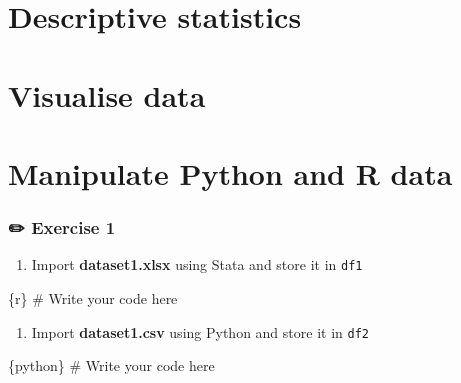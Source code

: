 \documentclass[
  letterpaper,
  DIV=11,
  numbers=noendperiod]{scrreprt}
\newenvironment{Shaded}{\begin{snugshade}}{\end{snugshade}}
\newcommand{\CommentTok}[1]{\textcolor[rgb]{0.37,0.37,0.37}{#1}}
\newcommand{\InformationTok}[1]{\textcolor[rgb]{0.37,0.37,0.37}{#1}}
\providecommand{\tightlist}{%
  \setlength{\itemsep}{0pt}\setlength{\parskip}{0pt}}\usepackage{longtable,booktabs,array}
\begin{document}
\hypertarget{descriptive-statistics}{%
\section{Descriptive statistics}\label{descriptive-statistics}}

\hypertarget{visualise-data}{%
\section{Visualise data}\label{visualise-data}}

\hypertarget{manipulate-python-and-r-data}{%
\section{Manipulate Python and R
data}\label{manipulate-python-and-r-data}}

\hypertarget{exercise-1-1}{%
\subsubsection{\texorpdfstring{{✏️} Exercise
1}{✏️ Exercise 1}}\label{exercise-1-1}}

\begin{enumerate}
\def\labelenumi{\arabic{enumi}.}
\tightlist
\item
  Import \textbf{dataset1.xlsx} using Stata and store it in \texttt{df1}
\end{enumerate}

\begin{Shaded}
\begin{Highlighting}[]
\InformationTok{\textasciigrave{}\textasciigrave{}\textasciigrave{}\{r\}}
\CommentTok{\# Write your code here}
\InformationTok{\textasciigrave{}\textasciigrave{}\textasciigrave{}}
\end{Highlighting}
\end{Shaded}

\begin{enumerate}
\def\labelenumi{\arabic{enumi}.}
\setcounter{enumi}{1}
\tightlist
\item
  Import \textbf{dataset1.csv} using Python and store it in \texttt{df2}
\end{enumerate}

\begin{Shaded}
\begin{Highlighting}[]
\InformationTok{\textasciigrave{}\textasciigrave{}\textasciigrave{}\{python\}}
\CommentTok{\# Write your code here}
\InformationTok{\textasciigrave{}\textasciigrave{}\textasciigrave{}}
\end{Highlighting}
\end{Shaded}
\end{document}
